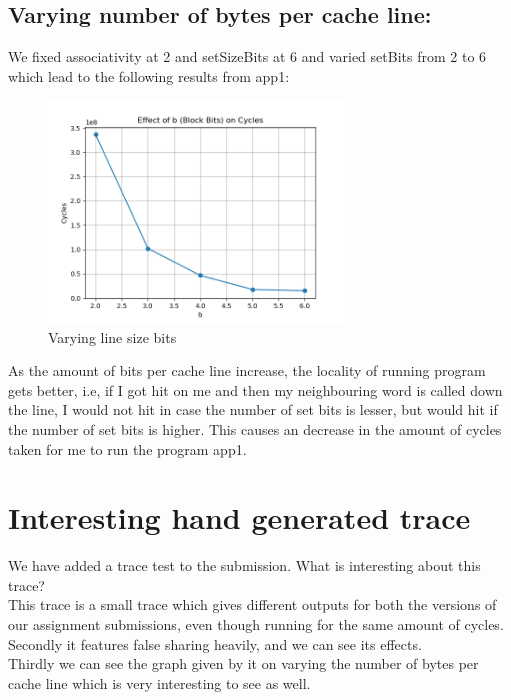 \documentclass{article}
\begin{document}
\subsection{Varying number of bytes per cache line:}
We fixed associativity at 2 and setSizeBits at 6 and varied setBits from 2 to 6 which lead to the following results from app1:
\begin{figure}[h]
  \centering
  \includegraphics[width=0.7\textwidth]{plot_vary_b.png}
  \caption{Varying line size bits}
  \label{fig:arch}
\end{figure}
As the amount of bits per cache line increase, the locality of running program gets better, i.e, if I got hit on me and then my neighbouring word is called down the line, I would not hit in case the number of set bits is lesser, but would hit if the number of set bits is higher. This causes an decrease in the amount of cycles taken for me to run the program app1.


\section{Interesting hand generated trace}

We have added a trace test to the submission. What is interesting about this trace? \\

This trace is a small trace which gives different outputs for both the versions of our assignment submissions, even though running for the same amount of cycles.\\

Secondly it features false sharing heavily, and we can see its effects.\\

Thirdly we can see the graph given by it on varying the number of bytes per cache line which is very interesting to see as well.\\
\end{document}
